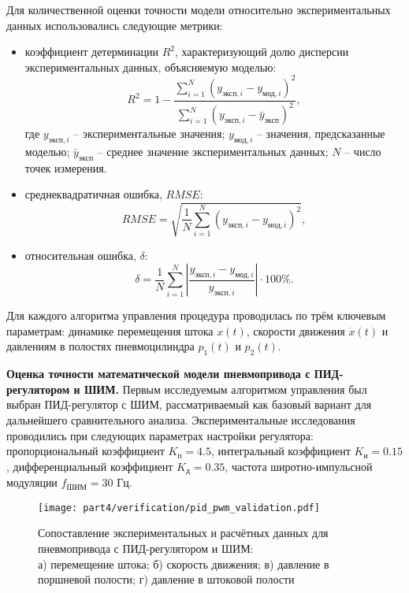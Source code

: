 Для количественной оценки точности модели относительно экспериментальных данных использовались следующие метрики:
\begin{itemize}
	\item коэффициент детерминации $R^2$, характеризующий долю дисперсии экспериментальных данных, объясняемую моделью:
	      \begin{equation}
		      R^2 = 1 - \frac{\sum_{i=1}^{N} (y_{\text{эксп},i} - y_{\text{мод},i})^2}{\sum_{i=1}^{N} (y_{\text{эксп},i} - \bar{y}_{\text{эксп}})^2},
	      \end{equation}
	      где $y_{\text{эксп},i}$ -- экспериментальные значения;
	      $y_{\text{мод},i}$ -- значения, предсказанные моделью;
	      $\bar{y}_{\text{эксп}}$ -- среднее значение экспериментальных данных;
	      $N$ -- число точек измерения.

	\item среднеквадратичная ошибка, $RMSE$:
	      \begin{equation}
		      RMSE = \sqrt{\frac{1}{N} \sum_{i=1}^{N} (y_{\text{эксп},i} - y_{\text{мод},i})^2},
	      \end{equation}

	\item относительная ошибка, $\delta$:
	      \begin{equation}
		      \delta = \frac{1}{N} \sum_{i=1}^{N} \left| \frac{y_{\text{эксп},i} - y_{\text{мод},i}}{y_{\text{эксп},i}} \right| \cdot 100\%.
	      \end{equation}
\end{itemize}

Для каждого алгоритма управления процедура проводилась по трём ключевым параметрам: динамике перемещения штока
$x(t)$, скорости движения $\dot{x}(t)$ и давлениям в полостях пневмоцилиндра $p_1(t)$ и $p_2(t)$.

\textbf{Оценка точности математической модели пневмопривода с ПИД-регулятором и ШИМ.}
Первым исследуемым алгоритмом управления был выбран ПИД-регулятор с ШИМ,
рассматриваемый как базовый вариант для дальнейшего сравнительного анализа.
Экспериментальные исследования проводились при следующих параметрах настройки регулятора:
пропорциональный коэффициент $K_\text{п} = \num{4.5}$, интегральный коэффициент $K_\text{и} =\num{0.15}$,
дифференциальный коэффициент $K_\text{д} = \num{0.35}$, частота широтно-импульсной модуляции $f_{\text{ШИМ}} = 30$ Гц.

\begin{figure}[ht]
	\centering
	\texttt{[image: part4/verification/pid\_pwm\_validation.pdf]}
	\caption{Сопоставление экспериментальных и расчётных данных для пневмопривода с ПИД-регулятором и ШИМ:\\
		а) перемещение штока; б) скорость движения; в) давление в поршневой полости; г) давление в штоковой полости}
	\label{fig:pid_pwm_validation}
\end{figure}


